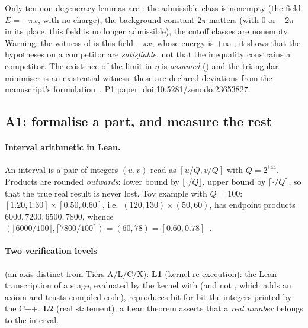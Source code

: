 \noindent Only ten non-degeneracy lemmas are \tierAs{}: the admissible class is nonempty (the field $E=-\pi x$,
with no charge), the background constant $2\pi$ matters (with $0$ or $-2\pi$ in its place, this field is no longer
admissible), the cutoff classes are nonempty. Warning: the witness of  is this
field $-\pi x$, whose energy is $+\infty$ \tierC{}; it shows that the hypotheses on a competitor are
\emph{satisfiable}, not that the inequality constrains a competitor. The existence of the limit in $\eta$ is \emph{assumed}
() and the triangular minimiser is an existential witness: these are declared deviations from the
manuscript's formulation~\cite{ch2ssa}. P1 paper: doi\string:10.5281/zenodo.23653827.

\subsection{A1: formalise a part, and measure the rest}\label{ch2:ssec:a1}
\paragraph{Interval arithmetic in Lean.} An interval is a pair of integers $(u,v)$ read as $[u/Q,v/Q]$ with
$Q=2^{144}$. Products are rounded \emph{outwards}: lower bound by $\lfloor\cdot/Q\rfloor$, upper
bound by $\lceil\cdot/Q\rceil$, so that the true real result is never lost. Toy example with $Q=100$:
$[1.20, 1.30]\times[0.50, 0.60]$, i.e.\ $(120,130)\times(50,60)$, has endpoint products
$6000,7200,6500,7800$, whence $(\lfloor6000/100\rfloor,\lceil7800/100\rceil)=(60,78)=[0.60, 0.78]$~\cite{ch2ssl}.

\paragraph{Two verification levels} (an axis distinct from Tiers A/L/C/X):
\textbf{L1} (kernel re-execution): the Lean transcription of a stage, evaluated by the kernel with
 (and not , which adds an axiom and trusts compiled code), reproduces
bit for bit the integers printed by the C++. \textbf{L2} (real statement): a Lean theorem asserts that a \emph{real
number} belongs to the interval.

